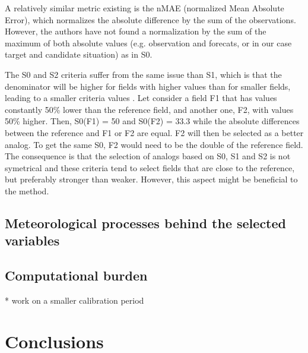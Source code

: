 \documentclass[draft]{agujournal2019}
\begin{document}
A relatively similar metric existing is the nMAE (normalized Mean Absolute Error), which normalizes the absolute difference by the sum of the observations. However, the authors have not found a normalization by the sum of the maximum of both absolute values (e.g. observation and forecats, or in our case target and candidate situation) as in S0.

The S0 and S2 criteria suffer from the same issue than S1, which is that the denominator will be higher for fields with higher values than for smaller fields, leading to a smaller criteria values \cite{Thompson1972}. Let consider a field F1 that has values constantly 50\% lower than the reference field, and another one, F2, with values 50\% higher. Then, S0(F1) = 50 and S0(F2) = 33.3 while the absolute differences between the reference and F1 or F2 are equal. F2 will then be selected as a better analog. To get the same S0, F2 would need to be the double of the reference field. The consequence is that the selection of analogs based on S0, S1 and S2 is not symetrical and these criteria tend to select fields that are close to the reference, but preferably stronger than weaker. However, this aspect might be beneficial to the method.



\subsection{Meteorological processes behind the selected variables}



\subsection{Computational burden}

* work on a smaller calibration period


\section{Conclusions}
\label{conclusions}
\end{document}
